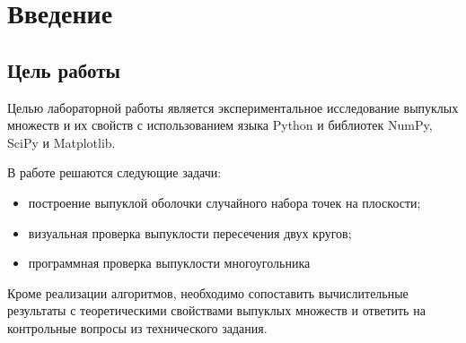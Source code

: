 \section{Введение}

\subsection{Цель работы}

Целью лабораторной работы является экспериментальное исследование выпуклых множеств и их свойств с использованием языка Python и библиотек NumPy, SciPy и Matplotlib.

В работе решаются следующие задачи:
\begin{itemize}
	\item построение выпуклой оболочки случайного набора точек на плоскости;
	\item визуальная проверка выпуклости пересечения двух кругов;
	\item программная проверка выпуклости многоугольника
\end{itemize}

Кроме реализации алгоритмов, необходимо сопоставить вычислительные результаты с теоретическими свойствами выпуклых множеств и ответить на контрольные вопросы из технического задания.

